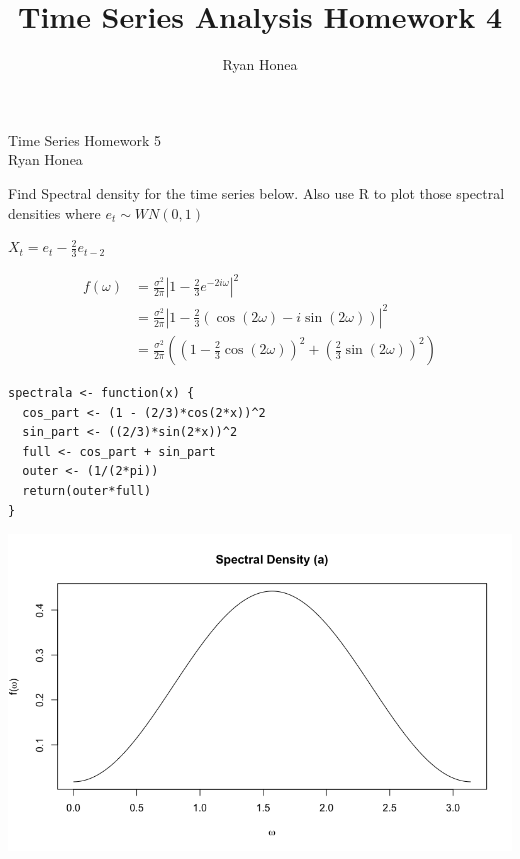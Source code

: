 \documentclass[10pt,a4paper]{exam}
\author{Ryan Honea}
\title{Time Series Analysis Homework 4}
\begin{document}
\begin{center}
Time Series Homework 5\\
Ryan Honea
\end{center}
\begin{questions}
\question Find Spectral density for the time series below. Also use R to plot those spectral densities where $e_t \sim WN(0,1)$
\begin{parts}
\item $X_t = e_t - \frac{2}{3}e_{t-2}$
\begin{solution}
\begin{align*}
f(\omega) 		&= \frac{\sigma^2}{2\pi}\left| 1 - \frac{2}{3}e^{-2i\omega} \right|^2\\
					&=  \frac{\sigma^2}{2\pi}\left| 1 - \frac{2}{3}\left(\cos(2\omega) - i\sin(2\omega)\right) \right|^2\\
					&=  \frac{\sigma^2}{2\pi}\left( \left(1 - \frac{2}{3}\cos(2\omega)\right)^2 + \left(\frac{2}{3}\sin(2\omega)\right)^2 \right)
\end{align*}
\begin{verbatim}
spectrala <- function(x) {
  cos_part <- (1 - (2/3)*cos(2*x))^2
  sin_part <- ((2/3)*sin(2*x))^2
  full <- cos_part + sin_part
  outer <- (1/(2*pi))
  return(outer*full)
}
\end{verbatim}
\begin{center}
\includegraphics[width = .9\linewidth]{1a}
\end{center}
\end{solution}

\pagebreak


\end{parts}
\end{questions}
\end{document}
